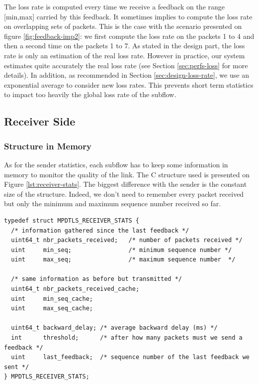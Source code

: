 The loss rate is computed every time we receive a feedback on the range [min,max] carried by this feedback. It sometimes implies to compute the loss rate on overlapping sets of packets. This is the case with the scenario presented on figure \ref{fig:feedback-imp2}: we first compute the loss rate on the packets 1 to 4 and then a second time on the packets 1 to 7. As stated in the design part, the loss rate is only an estimation of the real loss rate. However in practice, our system estimates quite accurately the real loss rate (see Section \ref{sec:perfs-loss} for more details). In addition, as recommended in Section \ref{sec:design-loss-rate}, we use an exponential average to consider new loss rates. This prevents short term statistics to impact too heavily the global loss rate of the subflow.

\subsection{Receiver Side}

\subsubsection{Structure in Memory}

As for the sender statistics, each subflow has to keep some information in memory to monitor the quality of the link. The C structure used is presented on Figure \ref{lst:receiver-stats}. The biggest difference with the sender is the constant size of the structure. Indeed, we don't need to remember every packet received but only the minimum and maximum sequence number received so far.

\begin{lstlisting}[caption=Receiver structure to store statistics, label=lst:receiver-stats]
typedef struct MPDTLS_RECEIVER_STATS {
  /* information gathered since the last feedback */
  uint64_t nbr_packets_received;   /* number of packets received */
  uint     min_seq;                /* minimum sequence number */
  uint     max_seq;                /* maximum sequence number  */
  
  /* same information as before but transmitted */
  uint64_t nbr_packets_received_cache;
  uint     min_seq_cache;
  uint     max_seq_cache;
  
  uint64_t backward_delay; /* average backward delay (ms) */
  int      threshold;      /* after how many packets must we send a feedback */
  uint     last_feedback;  /* sequence number of the last feedback we sent */
} MPDTLS_RECEIVER_STATS;
\end{lstlisting}

